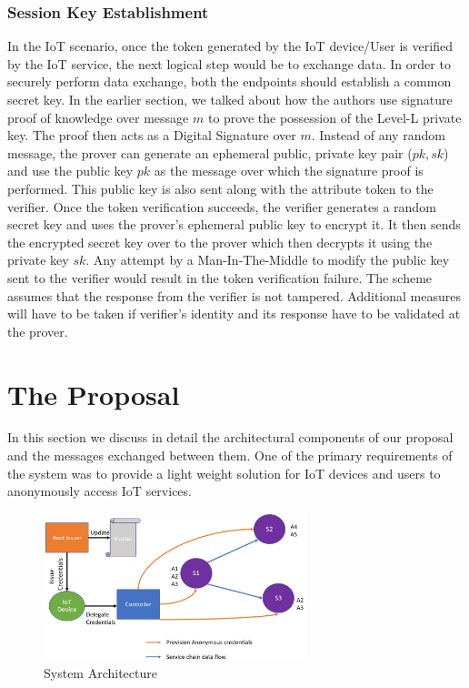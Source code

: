 \documentclass[journal]{IEEEtran}
\begin{document}
\subsubsection{Session Key Establishment} \label{keyest}
In the IoT scenario, once the token generated by the IoT device/User is verified by the IoT service, the next logical step would be to exchange data. In order to securely perform data exchange, both the endpoints should establish a common secret key. In the earlier section, we talked about how the authors use signature proof of knowledge over message $m$ to prove the possession of the Level-L private key. The proof then acts as a Digital Signature over $m$. Instead of any random message, the prover can generate an ephemeral public, private key pair ($pk,sk$) and use the public key $pk$ as the message over which the signature proof is performed. This public key is also sent along with the attribute token to the verifier. Once the token verification succeeds, the verifier generates a random secret key and uses the prover's ephemeral public key to encrypt it. It then sends the encrypted secret key over to the prover which then decrypts it using the private key $sk$. Any attempt by a Man-In-The-Middle to modify the public key sent to the verifier would result in the token verification failure. The scheme assumes that the response from the verifier is not tampered. Additional measures will have to be taken if verifier's identity and its response have to be validated at the prover.

\section{The Proposal} \label{proposal}
In this section we discuss in detail the architectural components of our proposal and the messages exchanged between them. One of the primary requirements of the system was to provide a light weight solution for IoT devices and users to anonymously access IoT services. 

\begin{figure}[htbp]
\centerline{\includegraphics[width=3in]{architecture.png}}
\caption{System Architecture}
\label{fig:sysarch}
\end{figure}
\end{document}
